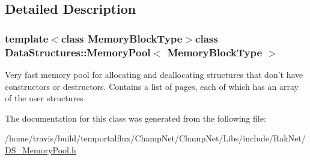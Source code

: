 \subsection{Detailed Description}
\subsubsection*{template$<$class Memory\-Block\-Type$>$class Data\-Structures\-::\-Memory\-Pool$<$ Memory\-Block\-Type $>$}

Very fast memory pool for allocating and deallocating structures that don't have constructors or destructors. Contains a list of pages, each of which has an array of the user structures 

The documentation for this class was generated from the following file\-:\begin{DoxyCompactItemize}
\item 
/home/travis/build/temportalflux/\-Champ\-Net/\-Champ\-Net/\-Libs/include/\-Rak\-Net/\hyperlink{_d_s___memory_pool_8h}{D\-S\-\_\-\-Memory\-Pool.\-h}\end{DoxyCompactItemize}
